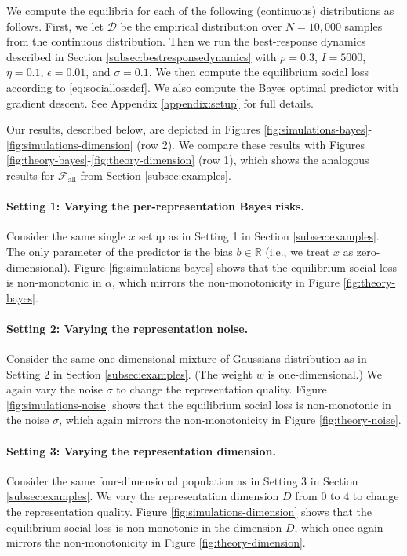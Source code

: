 \documentclass[letterpaper,11pt]{article}
\theoremstyle{plain}
\begin{document}
We compute the equilibria for each of the following (continuous) distributions as follows. First, we let $\mathcal{D}$ be the empirical distribution over $N = 10,000$ samples from the continuous distribution. Then we run the best-response dynamics described in Section \ref{subsec:bestresponsedynamics} with $\rho = 0.3$, $I = 5000$, $\eta = 0.1$, $\epsilon = 0.01$, and $\sigma = 0.1$. 
We then compute the equilibrium social loss according to \eqref{eq:sociallossdef}.  We also compute the Bayes optimal predictor with gradient descent. See Appendix \ref{appendix:setup} for full details. 
 
Our results, described below, are depicted in Figures \ref{fig:simulations-bayes}-\ref{fig:simulations-dimension} (row 2). We compare these results with Figures \ref{fig:theory-bayes}-\ref{fig:theory-dimension} (row 1), which shows the analogous results for $\mathcal{F}_{\text{all}}$ from Section \ref{subsec:examples}. 

\paragraph{Setting 1: Varying the per-representation Bayes risks.} Consider the same single $x$ setup as in Setting 1 in Section \ref{subsec:examples}. The only parameter of the predictor is the bias $b \in \mathbb{R}$ (i.e., we treat $x$ as zero-dimensional). %
Figure \ref{fig:simulations-bayes} shows that the equilibrium social loss is non-monotonic in $\alpha$, which mirrors the non-monotonicity in Figure \ref{fig:theory-bayes}.

\paragraph{Setting 2: Varying the representation noise.} 
Consider the same one-dimensional mixture-of-Gaussians distribution as in Setting 2 in Section \ref{subsec:examples}. (The weight $w$ is one-dimensional.) We again vary the noise $\sigma$ to change the representation quality. 
Figure \ref{fig:simulations-noise} shows that the equilibrium social loss is non-monotonic in the noise $\sigma$, which again mirrors the non-monotonicity in  Figure \ref{fig:theory-noise}. 

\paragraph{Setting 3: Varying the representation dimension.} Consider the same four-dimensional population as in Setting 3 in Section \ref{subsec:examples}. We vary the representation dimension $D$ from $0$ to $4$ to change the representation quality. Figure \ref{fig:simulations-dimension} shows that the equilibrium social loss is non-monotonic in the dimension $D$, which once again mirrors the non-monotonicity in  Figure \ref{fig:theory-dimension}. 
\end{document}
